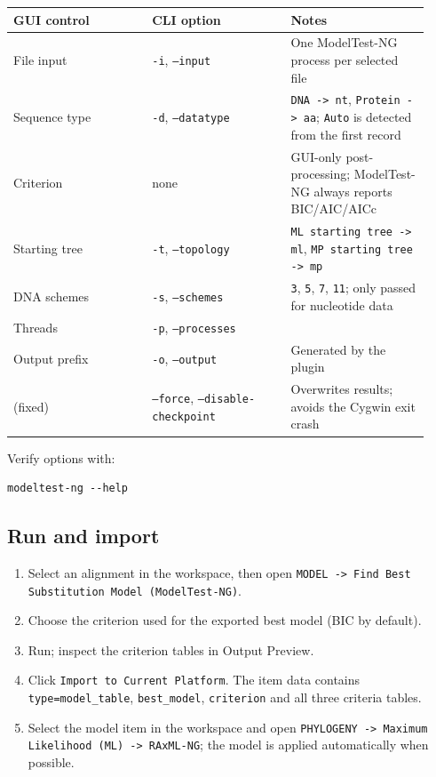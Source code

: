 \documentclass[11pt]{report}
\begin{document}
{\footnotesize
\begin{longtable}{@{}>{\raggedright\arraybackslash}p{0.31\linewidth}>{\raggedright\arraybackslash}p{0.31\linewidth}>{\raggedright\arraybackslash}p{0.31\linewidth}@{}}
\toprule
GUI control & CLI option & Notes \\
\midrule
\endhead
File input & \texttt{-i}, \texttt{--input} & One ModelTest-NG process per selected file \\
Sequence type & \texttt{-d}, \texttt{--datatype} & \texttt{DNA -> nt}, \texttt{Protein -> aa}; \texttt{Auto} is detected from the first record \\
Criterion & none & GUI-only post-processing; ModelTest-NG always reports BIC/AIC/AICc \\
Starting tree & \texttt{-t}, \texttt{--topology} & \texttt{ML starting tree -> ml}, \texttt{MP starting tree -> mp} \\
DNA schemes & \texttt{-s}, \texttt{--schemes} & \texttt{3}, \texttt{5}, \texttt{7}, \texttt{11}; only passed for nucleotide data \\
Threads & \texttt{-p}, \texttt{--processes} &  \\
Output prefix & \texttt{-o}, \texttt{--output} & Generated by the plugin \\
(fixed) & \texttt{--force}, \texttt{--disable-checkpoint} & Overwrites results; avoids the Cygwin exit crash \\
\bottomrule
\end{longtable}
}

Verify options with:

\begin{lstlisting}
modeltest-ng --help
\end{lstlisting}

\subsection{Run and import}

\begin{enumerate}
  \item Select an alignment in the workspace, then open \texttt{MODEL -> Find Best Substitution Model \allowbreak (ModelTest-NG)}.
  \item Choose the criterion used for the exported best model (BIC by default).
  \item Run; inspect the criterion tables in Output Preview.
  \item Click \texttt{Import to Current Platform}. The item data contains \texttt{type=model\_\allowbreak table}, \texttt{best\_\allowbreak model}, \texttt{criterion} and all three criteria tables.
  \item Select the model item in the workspace and open \texttt{PHYLOGENY -> Maximum Likelihood \allowbreak (ML) -> RAxML-NG}; the model is applied automatically when possible.
\end{enumerate}
\end{document}
